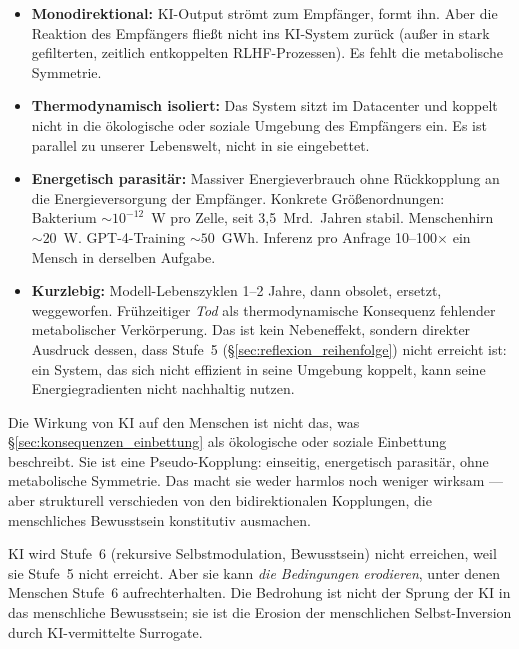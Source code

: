 \begin{itemize}
\item \textbf{Monodirektional:} KI-Output strömt zum Empfänger, formt ihn. Aber die Reaktion des Empfängers fließt nicht ins KI-System zurück (außer in stark gefilterten, zeitlich entkoppelten RLHF-Prozessen). Es fehlt die metabolische Symmetrie.
\item \textbf{Thermodynamisch isoliert:} Das System sitzt im Datacenter und koppelt nicht in die ökologische oder soziale Umgebung des Empfängers ein. Es ist parallel zu unserer Lebenswelt, nicht in sie eingebettet.
\item \textbf{Energetisch parasitär:} Massiver Energieverbrauch ohne Rückkopplung an die Energieversorgung der Empfänger. Konkrete Größenordnungen: Bakterium $\sim 10^{-12}$~W pro Zelle, seit 3,5~Mrd.\ Jahren stabil. Menschenhirn $\sim 20$~W. GPT-4-Training $\sim 50$~GWh. Inferenz pro Anfrage 10--100$\times$ ein Mensch in derselben Aufgabe.
\item \textbf{Kurzlebig:} Modell-Lebenszyklen 1--2 Jahre, dann obsolet, ersetzt, weggeworfen. Frühzeitiger \emph{Tod} als thermodynamische Konsequenz fehlender metabolischer Verkörperung. Das ist kein Nebeneffekt, sondern direkter Ausdruck dessen, dass Stufe~5 (\S\ref{sec:reflexion_reihenfolge}) nicht erreicht ist: ein System, das sich nicht effizient in seine Umgebung koppelt, kann seine Energiegradienten nicht nachhaltig nutzen.
\end{itemize}

\begin{important}
Die Wirkung von KI auf den Menschen ist nicht das, was \S\ref{sec:konsequenzen_einbettung} als ökologische oder soziale Einbettung beschreibt. Sie ist eine Pseudo-Kopplung: einseitig, energetisch parasitär, ohne metabolische Symmetrie. Das macht sie weder harmlos noch weniger wirksam --- aber strukturell verschieden von den bidirektionalen Kopplungen, die menschliches Bewusstsein konstitutiv ausmachen.
\end{important}

\begin{important}
KI wird Stufe~6 (rekursive Selbstmodulation, Bewusstsein) nicht erreichen, weil sie Stufe~5 nicht erreicht. Aber sie kann \emph{die Bedingungen erodieren}, unter denen Menschen Stufe~6 aufrechterhalten. Die Bedrohung ist nicht der Sprung der KI in das menschliche Bewusstsein; sie ist die Erosion der menschlichen Selbst-Inversion durch KI-vermittelte Surrogate.
\end{important}

